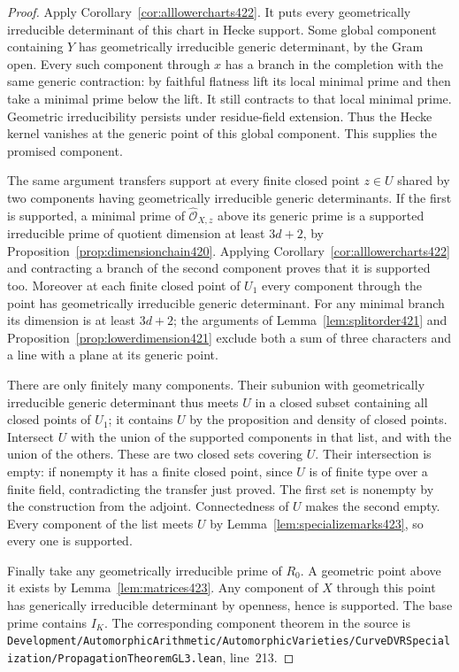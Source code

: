 \documentclass[a4paper,11pt]{article}
\theoremstyle{definition}
\theoremstyle{remark}
\newcommand{\srcloc}[2]{{\small\nolinkurl{#1.lean}}, line~#2}
\numberwithin{equation}{section}
\begin{document}
\begin{proof}
Apply Corollary~\ref{cor:alllowercharts422}. It puts every
geometrically irreducible determinant of this chart in Hecke
support. Some global component containing \(Y\) has geometrically
irreducible generic determinant, by the Gram open. Every such
component through \(x\) has a branch in the completion with the
same generic contraction: by faithful flatness lift its local
minimal prime and then take a minimal prime below the lift.
It still contracts to that local minimal prime. Geometric
irreducibility persists under residue-field extension. Thus
the Hecke kernel vanishes at the generic point of this global
component. This supplies the promised component.

The same argument transfers support at every finite closed
point \(z\in U\) shared by two components having geometrically
irreducible generic determinants. If the first is supported,
a minimal prime of \(\widehat{\mathcal O}_{X,z}\) above its
generic prime is a supported irreducible prime of quotient
dimension at least \(3d+2\), by
Proposition~\ref{prop:dimensionchain420}. Applying
Corollary~\ref{cor:alllowercharts422} and contracting a branch
of the second component proves that it is supported too.
Moreover at each finite closed point of \(U_1\) every component
through the point has geometrically irreducible generic
determinant. For any minimal branch its dimension is at least
\(3d+2\); the arguments of Lemma~\ref{lem:splitorder421} and
Proposition~\ref{prop:lowerdimension421} exclude both a sum of
three characters and a line with a plane at its generic point.

There are only finitely many components. Their subunion with
geometrically irreducible generic determinant thus meets \(U\)
in a closed subset containing all closed points of \(U_1\);
it contains \(U\) by the proposition and density of closed
points. Intersect \(U\) with the union of the supported
components in that list, and with the union of the others.
These are two closed sets covering \(U\). Their intersection
is empty: if nonempty it has a finite closed point, since \(U\)
is of finite type over a finite field, contradicting the
transfer just proved. The first set is nonempty by the
construction from the adjoint. Connectedness of \(U\) makes
the second empty. Every component of the list meets \(U\)
by Lemma~\ref{lem:specializemarks423}, so every one is supported.

Finally take any geometrically irreducible prime of \(R_0\).
A geometric point above it exists by Lemma~\ref{lem:matrices423}.
Any component of \(X\) through this point has generically
irreducible determinant by openness, hence is supported. The
base prime contains \(I_K\). The corresponding component theorem
in the source is
\srcloc{Development/AutomorphicArithmetic/AutomorphicVarieties/CurveDVRSpecialization/PropagationTheoremGL3}{213}.
\end{proof}
\end{document}
